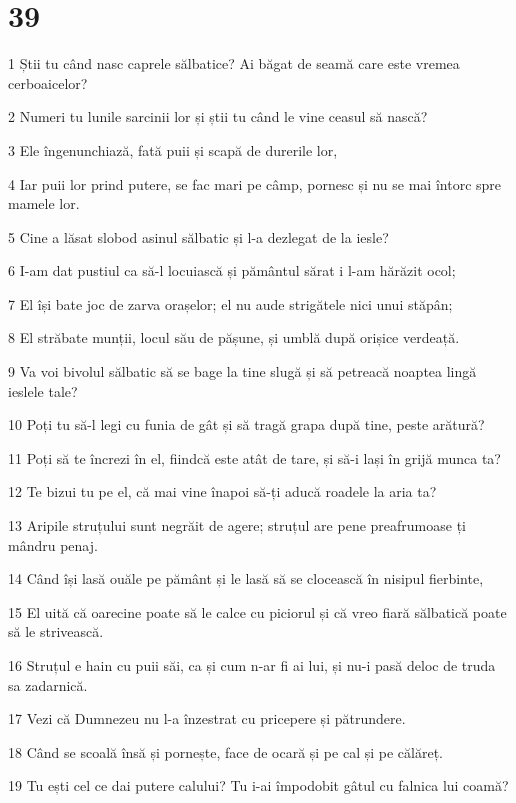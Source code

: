 \chapter{39}

\par 1 Știi tu când nasc caprele sălbatice? Ai băgat de seamă care este vremea cerboaicelor?
\par 2 Numeri tu lunile sarcinii lor și știi tu când le vine ceasul să nască?
\par 3 Ele îngenunchiază, fată puii și scapă de durerile lor,
\par 4 Iar puii lor prind putere, se fac mari pe câmp, pornesc și nu se mai întorc spre mamele lor.
\par 5 Cine a lăsat slobod asinul sălbatic și l-a dezlegat de la iesle?
\par 6 I-am dat pustiul ca să-l locuiască și pământul sărat i l-am hărăzit ocol;
\par 7 El își bate joc de zarva orașelor; el nu aude strigătele nici unui stăpân;
\par 8 El străbate munții, locul său de pășune, și umblă după orișice verdeață.
\par 9 Va voi bivolul sălbatic să se bage la tine slugă și să petreacă noaptea lingă ieslele tale?
\par 10 Poți tu să-l legi cu funia de gât și să tragă grapa după tine, peste arătură?
\par 11 Poți să te încrezi în el, fiindcă este atât de tare, și să-i lași în grijă munca ta?
\par 12 Te bizui tu pe el, că mai vine înapoi să-ți aducă roadele la aria ta?
\par 13 Aripile struțului sunt negrăit de agere; struțul are pene preafrumoase ți mândru penaj.
\par 14 Când își lasă ouăle pe pământ și le lasă să se clocească în nisipul fierbinte,
\par 15 El uită că oarecine poate să le calce cu piciorul și că vreo fiară sălbatică poate să le strivească.
\par 16 Struțul e hain cu puii săi, ca și cum n-ar fi ai lui, și nu-i pasă deloc de truda sa zadarnică.
\par 17 Vezi că Dumnezeu nu l-a înzestrat cu pricepere și pătrundere.
\par 18 Când se scoală însă și pornește, face de ocară și pe cal și pe călăreț.
\par 19 Tu ești cel ce dai putere calului? Tu i-ai împodobit gâtul cu falnica lui coamă?
